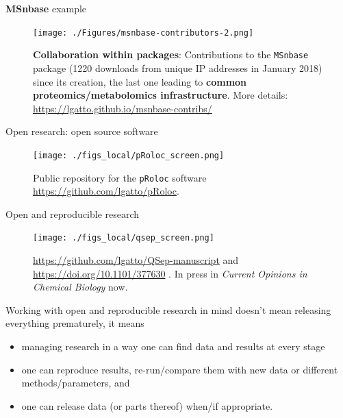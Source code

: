 \begin{frame}{\textbf{MSnbase} example}

  \begin{figure}[h]
    \centering
    \texttt{[image: ./Figures/msnbase-contributors-2.png]}
    \caption{\textbf{Collaboration within packages}: Contributions to the
      \texttt{MSnbase} package (1220 downloads from unique IP
      addresses in January 2018) since its creation, the last one
      leading to \textbf{common proteomics/metabolomics
        infrastructure}. More details:
      \url{https://lgatto.github.io/msnbase-contribs/}}
    \label{fig:msnbase}
  \end{figure}

\end{frame}

\begin{frame}{Open research: open source software}
  \centering
  \begin{figure}
  \texttt{[image: ./figs\_local/pRoloc\_screen.png]}
    \caption{Public repository for the \texttt{pRoloc} software
      \url{https://github.com/lgatto/pRoloc}.}
  \end{figure}
\end{frame}

\begin{frame}{Open and reproducible research}
  \centering
  \begin{figure}
    \texttt{[image: ./figs\_local/qsep\_screen.png]}
    \caption{\url{https://github.com/lgatto/QSep-manuscript} and
      \url{https://doi.org/10.1101/377630} \citep{Gatto:2018}. In
      press in \textit{Current Opinions in Chemical Biology} now.}
  \end{figure}
\end{frame}

\begin{frame}{}
Working with open and reproducible research in mind doesn't mean
releasing everything prematurely, it means

\begin{itemize}
\item managing research in a way one can find data and results at
  every stage

\item one can reproduce results, re-run/compare them with new data or
  different methods/parameters, and

\item  one can release data (or parts thereof) when/if appropriate.
\end{itemize}
\end{frame}

